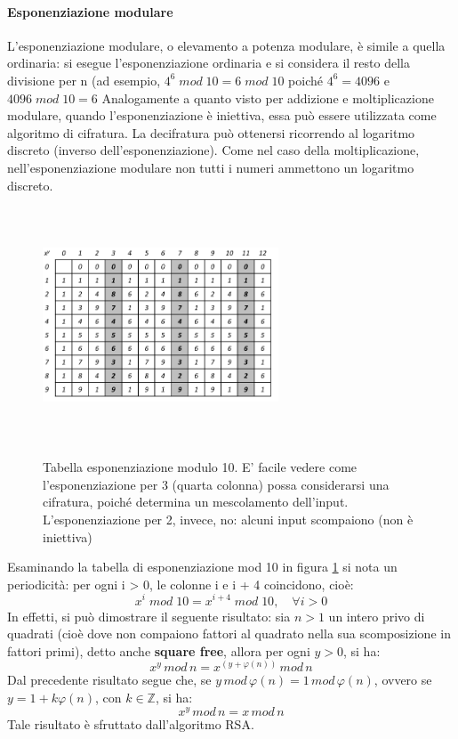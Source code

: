 \paragraph{Esponenziazione modulare}
L'esponenziazione modulare, o elevamento a potenza modulare, è simile a quella ordinaria: si esegue l'esponenziazione ordinaria e si considera il resto della divisione per n (ad esempio, $4^6 \; mod \; 10 = 6 \; mod \; 10$ poiché $4^6 = 4096$ e $4096 \; mod \; 10 = 6$
\newline \newline 
Analogamente a quanto visto per addizione e moltiplicazione modulare, quando l'esponenziazione è iniettiva, essa può essere utilizzata come algoritmo di cifratura. La decifratura può ottenersi ricorrendo al logaritmo discreto
(inverso dell'esponenziazione). Come nel caso della moltiplicazione, nell'esponenziazione modulare non tutti i numeri ammettono un logaritmo discreto.
\begin{figure}[htbp]
	\centering%
	\subfigure%
	{\includegraphics[height=7cm, width=7cm, keepaspectratio]{Immagini/chiave_pubblica/exp_mod.png}}
	\caption{Tabella esponenziazione modulo 10. E' facile vedere come l'esponenziazione per 3 (quarta colonna) possa considerarsi una cifratura, poiché determina un mescolamento dell’input. L'esponenziazione per 2, invece, no: alcuni input scompaiono (non è iniettiva) \label{fig:exp_mod}} 	
\end{figure}
\newline \newline
Esaminando la tabella di esponenziazione mod 10 in figura \ref{fig:exp_mod} si nota un periodicità: per ogni i > 0, le colonne i e i + 4 coincidono, cioè:
\begin{equation}
x^i \; mod \; 10 = x^{i + 4} \; mod \; 10, \quad \forall i>0
\end{equation}
In effetti, si può dimostrare il seguente risultato: sia $n > 1$ un intero privo di quadrati (cioè dove non compaiono fattori al quadrato nella sua scomposizione in fattori primi), detto anche \textbf{square free}, allora per ogni $y > 0$, si ha: 
\begin{equation}
x^y \, mod \, n = x^{(y + \varphi(n) )} \, mod \, n
\end{equation} 
Dal precedente risultato segue che, se $ y \, mod \, \varphi(n) = 1 \, mod \, \varphi(n) $, ovvero se $y = 1 + k \varphi(n) $, con $k \in \mathbb{Z}$, si ha:
\begin{equation}
x^y \, mod \, n = x \, mod \, n
\end{equation}
Tale risultato è sfruttato dall'algoritmo RSA.

